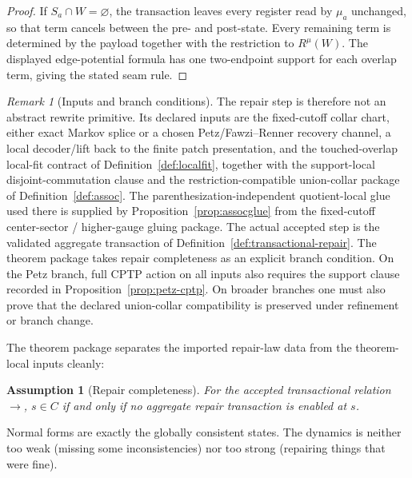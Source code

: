 \documentclass[11pt]{article}
\newtheorem{assumption}[theorem]{Assumption}
\theoremstyle{remark}
\newtheorem{remark}[theorem]{Remark}
\theoremstyle{plain}
\begin{document}
\begin{proof}
If \(S_a\cap W=\varnothing\), the transaction leaves every register read by \(\mu_a\) unchanged,
so that term cancels between the pre- and post-state. Every remaining term is determined by the
payload together with the restriction to \(R^\mu(W)\). The displayed edge-potential formula has
one two-endpoint support for each overlap term, giving the stated seam rule.
\end{proof}

\begin{remark}[Inputs and branch conditions]\label{rem:repair-burdens}
The repair step is therefore not an abstract rewrite primitive. Its declared inputs are the
fixed-cutoff collar chart, either exact Markov splice or a chosen Petz/Fawzi--Renner recovery
channel, a local decoder/lift back to the finite patch presentation, and the touched-overlap
local-fit contract of Definition~\ref{def:localfit}, together with the support-local
disjoint-commutation clause and the restriction-compatible union-collar package of
Definition~\ref{def:assoc}. The
parenthesization-independent quotient-local glue used there is supplied by
Proposition~\ref{prop:assocglue} from the fixed-cutoff center-sector / higher-gauge gluing
package. The actual accepted step is the validated aggregate transaction of
Definition~\ref{def:transactional-repair}. The theorem package takes repair completeness as an
explicit branch condition. On the Petz branch, full CPTP action on all inputs also requires the support clause
recorded in Proposition~\ref{prop:petz-cptp}. On broader branches one must also prove that
the declared union-collar compatibility is preserved under refinement or branch change.
\end{remark}

The theorem package separates the imported repair-law data from the theorem-local inputs cleanly:

\begin{assumption}[Repair completeness]\label{ass:complete}
For the accepted transactional relation \(\to\), \(s\in C\) if and only if no aggregate repair
transaction is enabled at \(s\).
\end{assumption}

Normal forms are exactly the globally consistent states. The dynamics is neither too weak (missing some inconsistencies) nor too strong (repairing things that were fine).
\end{document}
